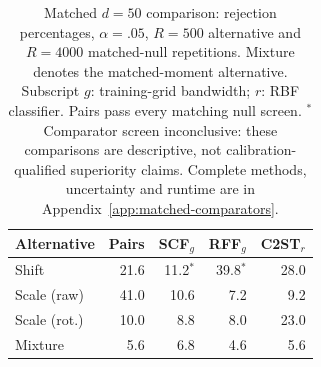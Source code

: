 {\color{blue}
\begin{table}[t]
\color{blue}
\centering
\scriptsize
\caption{Matched $d=50$ comparison: rejection percentages, $\alpha=.05$, $R=500$ alternative and $R=4000$ matched-null repetitions. Mixture denotes the matched-moment alternative. Subscript $g$: training-grid bandwidth; $r$: RBF classifier. Pairs pass every matching null screen. $^{*}$Comparator screen inconclusive: these comparisons are descriptive, not calibration-qualified superiority claims. Complete methods, uncertainty and runtime are in Appendix~\ref{app:matched-comparators}.}
\label{tab:comparator-main}
\setlength{\tabcolsep}{8pt}
\renewcommand{\arraystretch}{1.2}
\begin{tabular}{lrrrr}
\toprule
Alternative & Pairs & SCF$_g$ & RFF$_g$ & C2ST$_r$\\
\midrule
Shift & 21.6 & 11.2$^{*}$ & 39.8$^{*}$ & 28.0 \\
Scale (raw) & 41.0 & 10.6 & 7.2 & 9.2 \\
Scale (rot.) & 10.0 & 8.8 & 8.0 & 23.0 \\
Mixture & 5.6 & 6.8 & 4.6 & 5.6 \\
\bottomrule
\end{tabular}
\end{table}
}
